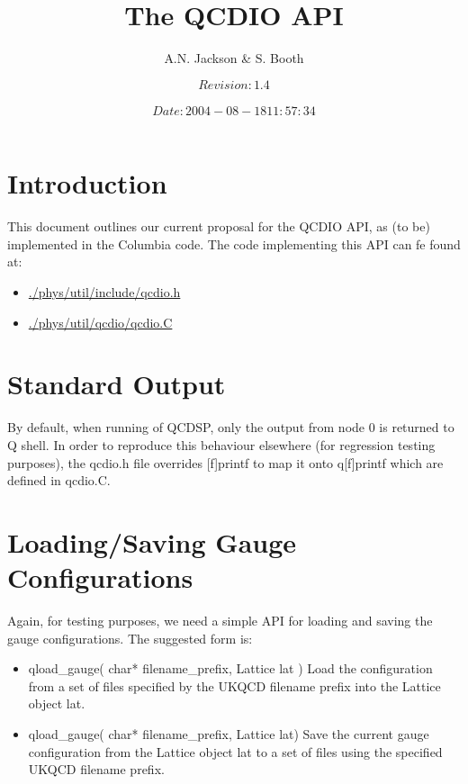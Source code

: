 \documentclass[12pt]{article}
\title{The QCDIO API}
\author{A.N. Jackson \& S. Booth}
\date{\mbox{\small $$Revision: 1.4 $$  $$Date: 2004-08-18 11:57:34 $$}}
\begin{document}
\maketitle

\tableofcontents
\newpage

\section{Introduction}
This document outlines our current proposal for the QCDIO API, as (to be)
implemented in the Columbia code.  The code implementing this API can fe found
at: 
\begin{itemize}
 \item
 \href{../doxygen/html/qcdio_h.html}{./phys/util/include/qcdio.h}
 \item
 \href{../doxygen/html/qcdio_C.html}{./phys/util/qcdio/qcdio.C}
\end{itemize}

\section{Standard Output}
By default, when running of QCDSP, only the output from node 0 is returned to
Q shell.  In order to reproduce this behaviour elsewhere (for regression testing
purposes), the qcdio.h file overrides [f]printf to map it onto q[f]printf
which are defined in qcdio.C.

\section{Loading/Saving Gauge Configurations}
Again, for testing purposes, we need a simple API for loading and saving the
gauge configurations.  The suggested form is:
\begin{itemize}
\item{qload\_gauge( char* filename\_prefix, Lattice lat )}
Load the configuration from a set of files specified by the UKQCD filename
prefix into the Lattice object lat.
\item{qload\_gauge( char* filename\_prefix, Lattice lat)}
Save the current gauge configuration from the Lattice object lat to a set of 
files using the specified UKQCD filename prefix.
\end{itemize}
\end{document}
